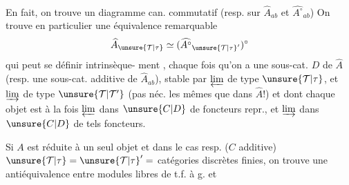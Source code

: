 En fait, on trouve un diagramme
can. commutatif
(resp. sur $\widehat A_{ab}$ et $\widehat{A^\circ}_{ab}$)
On trouve en particulier une
équivalence remarquable
\[
\widehat A_{\unsure{\mathcal{T}|\tau}}\simeq(\widehat{A^\circ}_{\unsure{\mathcal{T}|\tau}'})^\circ
\]
qui peut se définir intrinsèque-
ment , chaque fois qu'on a une
sous-cat. $D$ de $\widehat A$ (resp. une sous-cat.
additive de $\widehat A_{ab}$), stable  par
$\varprojlim$ de type $\unsure{\mathcal{T}|\tau}$, et  $\varinjlim$ de type $\unsure{\mathcal{T}|\mathcal{T}'}$
(pas néc. les mêmes que dans $\widehat A$!)
et dont chaque objet est à la fois
$\varprojlim$  dans $\unsure{C|D}$ de foncteurs repr.,
et $\varinjlim$  dans $\unsure{C|D}$ de tels foncteurs.

Si $A$ est réduite à un seul objet  et
dans le cas resp. ($C$ additive)
$\unsure{\mathcal{T}|\tau}=\unsure{\mathcal{T}|\tau}'=$  catégories discrètes finies,
on trouve une antiéquivalence
entre modules libres de t.f. à g. et

